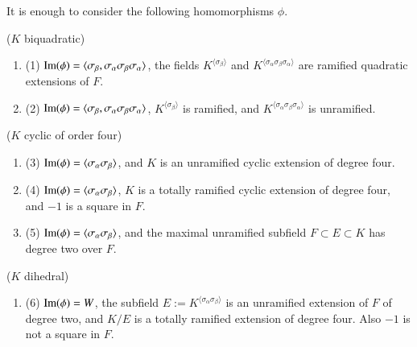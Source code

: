 \documentclass{amsart}
\newcommand\Ima{\hbox{Im}}
\newenvironment{cthm}[1]
  {\renewcommand\thethm{\bf #1}\thm}
  {\endthm}
\begin{document}
\bigskip
\noindent
\begin{cthm}{Lemma 3.2}   It is enough to consider the following
homomorphisms $\phi$. 

\noindent($K$ biquadratic)
\begin{enumerate}[label=]
\item (1) $\Ima(\phi)=\langle\sigma_\beta,\sigma_\alpha\sigma_\beta
   \sigma_\alpha\rangle$, the fields
   $K^{\langle\sigma_\beta\rangle}$ and $K^{\langle
       \sigma_\alpha\sigma_\beta\sigma_\alpha\rangle}$ are
  ramified quadratic extensions of $F$.

\item (2) $\Ima(\phi)=\langle\sigma_\beta,\sigma_\alpha\sigma_\beta
   \sigma_\alpha\rangle$,
   $K^{\langle\sigma_\beta\rangle}$ is ramified, and $K^{\langle
       \sigma_\alpha\sigma_\beta\sigma_\alpha\rangle}$ is unramified.
\smallskip
\end{enumerate}
($K$ cyclic of order four)
\begin{enumerate}[label=]
\item (3)  $\Ima(\phi)=\langle\sigma_\alpha\sigma_\beta\rangle$, and $K$
 is an unramified cyclic extension of degree four.

\item(4)   $\Ima(\phi)=\langle\sigma_\alpha\sigma_\beta\rangle$, $K$
 is a totally ramified cyclic extension of degree four, and
$-1$ is a square in $F$.

\item (5)  $\Ima(\phi)=\langle\sigma_\alpha\sigma_\beta\rangle$, and the
 maximal unramified subfield 
 $F\subset E\subset K$ has degree two over $F$.
\end{enumerate}
\smallskip
($K$ dihedral)
\begin{enumerate}[label=]
\item(6)  $\Ima(\phi) = W$, the subfield 
$E:= K^{\langle\sigma_\alpha\sigma_\beta\rangle}$
is an unramified extension of $F$ of degree two, and $K/E$ is a
totally ramified extension of degree four.
Also $-1$ is not a square in $F$.
\end{enumerate}
\end{cthm}
\end{document}
